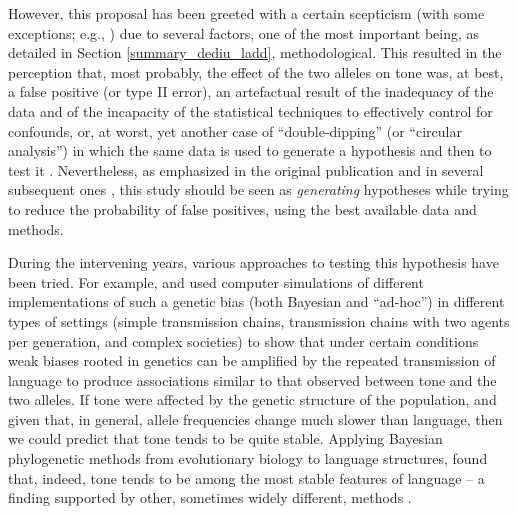 \documentclass[twoside,onecolumn]{article}
\begin{document}
However, this proposal has been greeted with a certain scepticism  (with some exceptions; e.g., \citealp{roberts_traffic_2013}) due to several factors, one of the most important being, as detailed in Section \ref{summary_dediu_ladd}, methodological.
This resulted in the perception that, most probably, the effect of the two alleles on tone was, at best, a false positive (or type II error), an artefactual result of the inadequacy of the data and of the incapacity of the statistical techniques to effectively control for confounds, or, at worst, yet another case of ``double-dipping'' (or ``circular analysis'') in which the same data is used to generate a hypothesis and then to test it \citep{kriegeskorte_circular_2009}.
Nevertheless, as emphasized in the original publication and in several subsequent ones \citep{dediu_ladd_2007,ladd_bioling_2008,dediu_humbiol_2011}, this study should be seen as \emph{generating} hypotheses while trying to reduce the probability of false positives, using the best available data and methods.

During the intervening years, various approaches to testing this hypothesis have been tried.
For example, \citet{dediu_jtb_2008} and \citet{dediu_jtb_2009} used computer simulations of different implementations of such a genetic bias (both Bayesian and ``ad-hoc'') in different types of settings (simple transmission chains, transmission chains with two agents per generation, and complex societies) to show that under certain conditions weak biases rooted in genetics can be amplified by the repeated transmission of language to produce associations similar to that observed between tone and the two alleles.
If tone were affected by the genetic structure of the population, and given that, in general, allele frequencies change much slower than language, then we could predict that tone tends to be quite stable.
Applying Bayesian phylogenetic methods from evolutionary biology to language structures, \citet{dediu_procb_2011} found that, indeed, tone tends to be among the most stable features of language -- a finding supported by other, sometimes widely different, methods \citep{dediu_cysouw_2013,kauhanen_geospatial_2018}.
\end{document}
